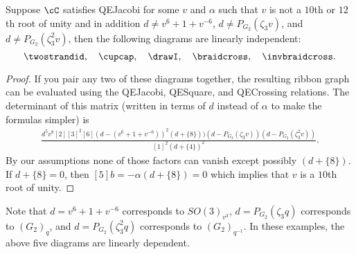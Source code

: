 \documentclass[12pt]{amsart}
\begin{document}
\begin{lemma} \label{lem:lin-ind-w}
Suppose $\cC$ satisfies QEJacobi for some $v$ and $\alpha$ such that $v$ is
not a $10$th or $12$th root of unity and in addition $d \neq v^6+1+v^{-6}$, $d
\neq P_{G_2}(\zeta_3 v)$, and $d \neq P_{G_2}(\zeta_3^2 v)$, then the
following diagrams are linearly independent:
$$\twostrandid,\quad \cupcap,\quad \drawI,\quad\braidcross,\quad\invbraidcross.$$
\end{lemma}
\begin{proof}
If you pair any two of these diagrams together, the resulting ribbon graph can
be evaluated using the QEJacobi, QESquare, and QECrossing relations.  The
determinant of this matrix (written in terms of $d$ instead of $\alpha$ to
make the formulas simpler) is
\begin{align*}
\frac
{
d^5 v^8 [2][3]^2[6] (d-(v^{6}+1+v^{-6}))^2 (d + \{8\})) (d-P_{G_2}(\zeta_3 v)) (d-P_{G_2}(\zeta_3^2 v))
}
{
[1]^{2}(d + \{4\})^{2}
}.
\end{align*}
By our assumptions none of those factors can vanish except possibly
$(d+\{8\})$.  If $d+\{8\} = 0$, then $[5]b = -\alpha(d+\{8\})= 0$ which implies
that $v$ is a $10$th root of unity.
\end{proof}

\begin{remark}
Note that $d = v^6+1+v^{-6}$ corresponds to $SO(3)_{v^3}$, $d=P_{G_2}(\zeta_3 q)$ 
corresponds to $(G_2)_{q}$, and $d=P_{G_2}(\zeta_3^2 q)$ corresponds to
$(G_2)_{q^{-1}}$.  In these examples, the above five diagrams are linearly
dependent.  
\end{remark}

\end{document}
